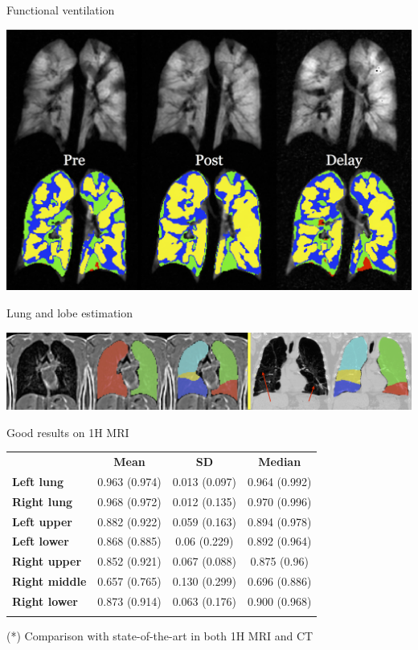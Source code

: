 \documentclass[ignorenonframetext,]{beamer}
\begin{document}
\begin{frame}{Functional ventilation}

\includegraphics{./lung/figures/prePostAlbuterol.png}

\end{frame}

\begin{frame}{Lung and lobe estimation}

\includegraphics{./lung/figures/lungEstimation.png}

\end{frame}

\begin{frame}{Good results on 1H MRI}

\begin{longtable}[c]{@{}lccc@{}}
\toprule\addlinespace
& \textbf{Mean} & \textbf{SD} & \textbf{Median}
\\\addlinespace
\midrule\endhead
\textbf{Left lung} & 0.963 (0.974) & 0.013 (0.097) & 0.964 (0.992)
\\\addlinespace
\textbf{Right lung} & 0.968 (0.972) & 0.012 (0.135) & 0.970 (0.996)
\\\addlinespace
\textbf{Left upper} & 0.882 (0.922) & 0.059 (0.163) & 0.894 (0.978)
\\\addlinespace
\textbf{Left lower} & 0.868 (0.885) & 0.06 (0.229) & 0.892 (0.964)
\\\addlinespace
\textbf{Right upper} & 0.852 (0.921) & 0.067 (0.088) & 0.875 (0.96)
\\\addlinespace
\textbf{Right middle} & 0.657 (0.765) & 0.130 (0.299) & 0.696 (0.886)
\\\addlinespace
\textbf{Right lower} & 0.873 (0.914) & 0.063 (0.176) & 0.900 (0.968)
\\\addlinespace
\bottomrule
\end{longtable}

(*) Comparison with state-of-the-art in both 1H MRI and CT

\end{frame}
\end{document}
